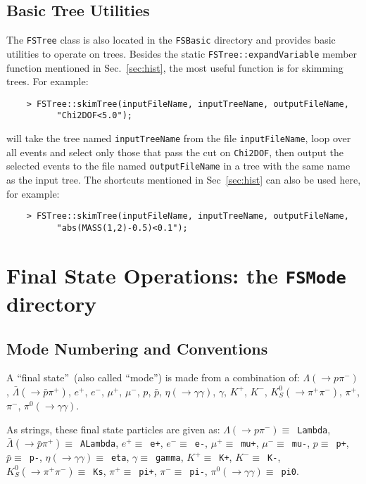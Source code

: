\documentclass[11pt]{article}
\begin{document}
\subsection{Basic Tree Utilities}
\label{sec:tree}

The {\tt FSTree} class is also located in the {\tt FSBasic} directory and provides basic utilities to operate on trees.  
Besides the static {\tt FSTree::expandVariable} member function mentioned in Sec.~\ref{sec:hist}, the most useful function is for skimming trees.  For example:
\begin{verbatim}
    > FSTree::skimTree(inputFileName, inputTreeName, outputFileName,
          "Chi2DOF<5.0"); 
\end{verbatim}
will take the tree named {\tt inputTreeName} from the file {\tt inputFileName}, loop over all events and select only those that pass the cut on {\tt Chi2DOF}, then output the selected events to the file named {\tt outputFileName} in a tree with the same name as the input tree.  The shortcuts mentioned in Sec~\ref{sec:hist} can also be used here, for example:
\begin{verbatim}
    > FSTree::skimTree(inputFileName, inputTreeName, outputFileName,
          "abs(MASS(1,2)-0.5)<0.1"); 
\end{verbatim}

\section{Final State Operations:  the {\tt FSMode} directory}


\subsection{Mode Numbering and Conventions}

A ``final state''~(also called ``mode'') is made from a combination of: $\Lambda (\to p \pi^-)$, $\bar{\Lambda} (\to \bar{p} \pi^+)$, $e^+$, $e^-$, $\mu^+$, $\mu^-$, $p$, $\bar{p}$, $\eta (\to \gamma\gamma)$, $\gamma$, $K^+$, $K^-$, $K^0_S (\to \pi^+\pi^-)$, $\pi^+$, $\pi^-$, $\pi^0 (\to \gamma\gamma)$.

As strings, these final state particles are given as:
$\Lambda (\to p \pi^-) \equiv $~{\tt Lambda}, 
$\bar{\Lambda} (\to \bar{p} \pi^+) \equiv $~{\tt ALambda}, 
$e^+ \equiv $~{\tt e+}, 
$e^- \equiv $~{\tt e-}, 
$\mu^+ \equiv $~{\tt mu+},  
$\mu^- \equiv $~{\tt mu-}, 
$p \equiv $~{\tt p+}, 
$\bar{p} \equiv $~{\tt p-}, 
$\eta (\to \gamma\gamma) \equiv $~{\tt eta}, 
$\gamma \equiv $~{\tt gamma}, 
$K^+ \equiv $~{\tt K+}, 
$K^- \equiv $~{\tt K-}, 
$K^0_S (\to \pi^+\pi^-) \equiv $~{\tt Ks}, 
$\pi^+ \equiv $~{\tt pi+}, 
$\pi^- \equiv $~{\tt pi-}, 
$\pi^0 (\to \gamma\gamma) \equiv $~{\tt pi0}.
\end{document}
